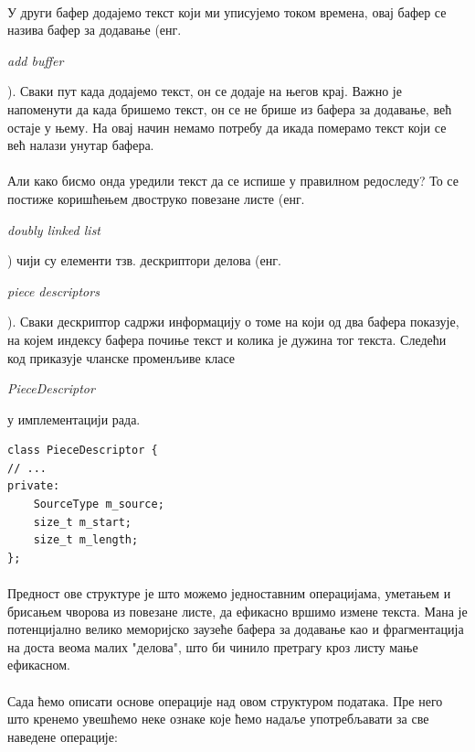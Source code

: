 \documentclass[12pt,oneside]{memoir}
\begin{document}
\paragraph{}
У други бафер додајемо текст који ми уписујемо током времена, овај бафер се
назива бафер за додавање (енг. \begin{latinica}\textit{add buffer}\end{latinica}). Сваки пут
када додајемо текст, он се додаје на његов крај. Важно је напоменути да када бришемо
текст, он се не брише из бафера за додавање, већ остаје у њему. На овај начин немамо потребу
да икада померамо текст који се већ налази унутар бафера.

\paragraph{}
Али како бисмо онда уредили текст да се испише у правилном редоследу? То се постиже
коришћењем двоструко повезане листе (енг. \begin{latinica}\textit{doubly linked list}
\end{latinica}) чији су елементи тзв. дескриптори делова (енг. \begin{latinica}
\textit{piece descriptors}\end{latinica}). Сваки дескриптор садржи информацију о томе на који од
два бафера показује, на којем индексу бафера почиње текст и колика је дужина тог текста. 
Следећи код приказује чланске променљиве класе \begin{latinica}\textit{PieceDescriptor}\end{latinica} у имплементацији рада.

\begin{verbatim}
class PieceDescriptor {
// ...
private:
    SourceType m_source;
    size_t m_start;
    size_t m_length;
};
\end{verbatim}

\paragraph{}
Предност ове структуре је што можемо једноставним операцијама, уметањем и брисањем чворова из
повезане листе, да ефикасно вршимо измене текста. Мана је потенцијално велико меморијско заузеће
бафера за додавање као и фрагментација на доста веома малих "делова", што би чинило претрагу
кроз листу мање ефикасном.

\paragraph{}
Сада ћемо описати основе операције над овом структуром података. Пре него што кренемо 
увешћемо неке ознаке које ћемо надаље употребљавати за све наведене операције:
\end{document}
